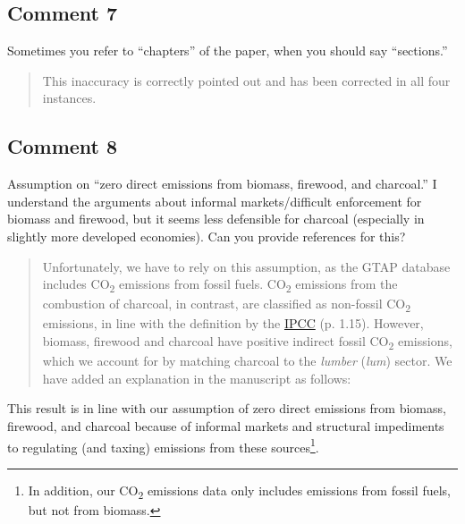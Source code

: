 \documentclass[11pt]{article}
\newenvironment{response}
{\begin{quote}\color{black}}
{\end{quote}}
\begin{document}
\subsection*{Comment 7}\label{comment_R2_7}

\begin{commentbox}
    Sometimes you refer to “chapters” of the paper, when you should say “sections.”
\end{commentbox}

\begin{response}
    This inaccuracy is correctly pointed out and has been corrected in all four instances.
\end{response}

\subsection*{Comment 8}\label{comment_R2_8}

\begin{commentbox}
    Assumption on “zero direct emissions from biomass, firewood, and charcoal.” I understand the arguments about informal markets/difficult enforcement for biomass and firewood, but it seems less defensible for charcoal (especially in slightly more developed economies). Can you provide references for this?
\end{commentbox}

\begin{response}
    Unfortunately, we have to rely on this assumption, as the GTAP database includes CO\textsubscript{2} emissions from fossil fuels. CO\textsubscript{2} emissions from the combustion of charcoal, in contrast, are classified as non-fossil CO\textsubscript{2} emissions, in line with the definition by the \href{https://www.ipcc-nggip.iges.or.jp/public/2006gl/pdf/2_Volume2/V2_1_Ch1_Introduction.pdf}{IPCC} (p. 1.15). However, biomass, firewood and charcoal have positive indirect fossil CO\textsubscript{2} emissions, which we account for by matching charcoal to the \textit{lumber} (\textit{lum}) sector. We have added an explanation in the manuscript as follows:
\end{response}

\begin{revisionbox}
    This result is in line with our assumption of zero direct emissions from biomass, firewood, and charcoal because of informal markets and structural impediments to regulating (and taxing) emissions from these sources\footnote{In addition, our CO\textsubscript{2} emissions data only includes emissions from fossil fuels, but not from biomass.}.
\end{revisionbox}
    
\end{document}
